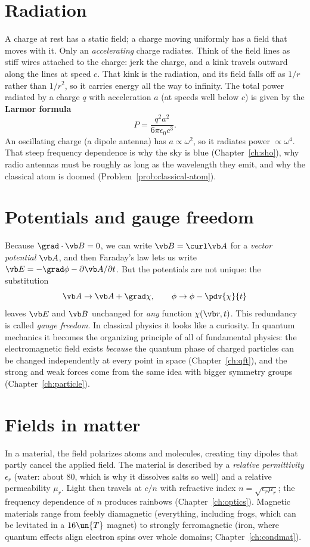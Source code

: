 \section{Radiation}

A charge at rest has a static field; a charge moving uniformly has a field that moves with it. Only an \emph{accelerating} charge radiates. Think of the field lines as stiff wires attached to the charge: jerk the charge, and a kink travels outward along the lines at speed $c$. That kink is the radiation, and its field falls off as $1/r$ rather than $1/r^2$, so it carries energy all the way to infinity. The total power radiated by a charge $q$ with acceleration $a$ (at speeds well below $c$) is given by the \textbf{Larmor formula}
\[
  P = \frac{q^2a^2}{6\pi\epsilon_0c^3}.
\]
An oscillating charge (a dipole antenna) has $a\propto\omega^2$, so it radiates power $\propto\omega^4$. That steep frequency dependence is why the sky is blue (Chapter~\ref{ch:sho}), why radio antennas must be roughly as long as the wavelength they emit, and why the classical atom is doomed (Problem~\ref{prob:classical-atom}).

\section{Potentials and gauge freedom}

Because $\grad\cdot\vb B = 0$, we can write $\vb B = \curl\vb A$ for a \emph{vector potential} $\vb A$, and then Faraday's law lets us write $\vb E = -\grad\phi - \partial\vb A/\partial t$. But the potentials are not unique: the substitution
\[
  \vb A \to \vb A + \grad\chi, \qquad \phi \to \phi - \pdv{\chi}{t}
\]
leaves $\vb E$ and $\vb B$ unchanged for \emph{any} function $\chi(\vb r,t)$. This redundancy is called \emph{gauge freedom}. In classical physics it looks like a curiosity. In quantum mechanics it becomes the organizing principle of all of fundamental physics: the electromagnetic field exists \emph{because} the quantum phase of charged particles can be changed independently at every point in space (Chapter~\ref{ch:qft}), and the strong and weak forces come from the same idea with bigger symmetry groups (Chapter~\ref{ch:particle}).

\section{Fields in matter}

In a material, the field polarizes atoms and molecules, creating tiny dipoles that partly cancel the applied field. The material is described by a \emph{relative permittivity} $\epsilon_r$ (water: about $80$, which is why it dissolves salts so well) and a relative permeability $\mu_r$. Light then travels at $c/n$ with refractive index $n = \sqrt{\epsilon_r\mu_r}$; the frequency dependence of $n$ produces rainbows (Chapter~\ref{ch:optics}). Magnetic materials range from feebly diamagnetic (everything, including frogs, which can be levitated in a $16\un{T}$ magnet) to strongly ferromagnetic (iron, where quantum effects align electron spins over whole domains; Chapter~\ref{ch:condmat}).

